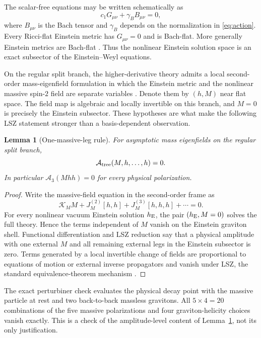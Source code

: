 \documentclass[11pt]{article}
\newtheorem{lemma}[theorem]{Lemma}
\theoremstyle{definition}
\theoremstyle{remark}
\begin{document}
The scalar-free equations may be written schematically as
\begin{equation}\label{eq:ewfield}
c_1G_{\mu\nu}+\gamma_B B_{\mu\nu}=0,
\end{equation}
where $B_{\mu\nu}$ is the Bach tensor and $\gamma_B$ depends on the
normalization in \eqref{eq:action}.  Every Ricci-flat Einstein metric has
$G_{\mu\nu}=0$ and is Bach-flat.  More generally Einstein metrics are
Bach-flat \cite{LiuLuPope}.  Thus the nonlinear Einstein solution space
is an exact subsector of the Einstein--Weyl equations.

On the regular split branch, the higher-derivative theory admits a local
second-order mass-eigenfield formulation in which the Einstein metric and
the nonlinear massive spin-$2$ field are separate variables
\cite{MagnanoSokolowski}.  Denote them by $(h,M)$ near flat space.  The
field map is algebraic and locally invertible on this branch, and $M=0$
is precisely the Einstein subsector.  These hypotheses are what make the
following LSZ statement stronger than a basis-dependent observation.

\begin{lemma}[One-massive-leg rule]\label{lem:onemassive}
For asymptotic mass eigenfields on the regular split branch,
\begin{equation}\label{eq:onemassive}
\mathcal A_{\rm tree}(M,h,\ldots,h)=0.
\end{equation}
In particular $\mathcal A_3(Mhh)=0$ for every physical polarization.
\end{lemma}

\begin{proof}
Write the massive-field equation in the second-order frame as
\begin{equation}
\mathcal K_M M+J_M^{(2)}[h,h]+J_M^{(3)}[h,h,h]+\cdots=0.
\end{equation}
For every nonlinear vacuum Einstein solution $h_{\rm E}$, the pair
$(h_{\rm E},M=0)$ solves the full theory.  Hence the terms independent of
$M$ vanish on the Einstein graviton shell.  Functional differentiation
and LSZ reduction say that a physical amplitude with one external $M$
and all remaining external legs in the Einstein subsector is zero.
Terms generated by a local invertible change of fields are proportional
to equations of motion or external inverse propagators and vanish under
LSZ, the standard equivalence-theorem mechanism \cite{KOS}.
\end{proof}

The exact perturbiner check evaluates the physical decay point with the
massive particle at rest and two back-to-back massless gravitons.  All
$5\times4=20$ combinations of the five massive polarizations and four
graviton-helicity choices vanish exactly.  This is a check of the
amplitude-level content of Lemma~\ref{lem:onemassive}, not its only
justification.
\end{document}

